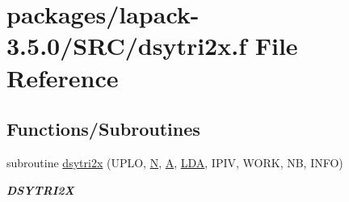 \hypertarget{dsytri2x_8f}{}\section{packages/lapack-\/3.5.0/\+S\+R\+C/dsytri2x.f File Reference}
\label{dsytri2x_8f}
\subsection*{Functions/\+Subroutines}
\begin{DoxyCompactItemize}
\item 
subroutine \hyperlink{group__doubleSYcomputational_ga07bd3f2e70c93074ff28bce809b047e5}{dsytri2x} (U\+P\+L\+O, \hyperlink{polmisc_8c_a0240ac851181b84ac374872dc5434ee4}{N}, \hyperlink{classA}{A}, \hyperlink{example__user_8c_ae946da542ce0db94dced19b2ecefd1aa}{L\+D\+A}, I\+P\+I\+V, W\+O\+R\+K, N\+B, I\+N\+F\+O)
\begin{DoxyCompactList}\small\item\em {\bfseries D\+S\+Y\+T\+R\+I2\+X} \end{DoxyCompactList}\end{DoxyCompactItemize}
